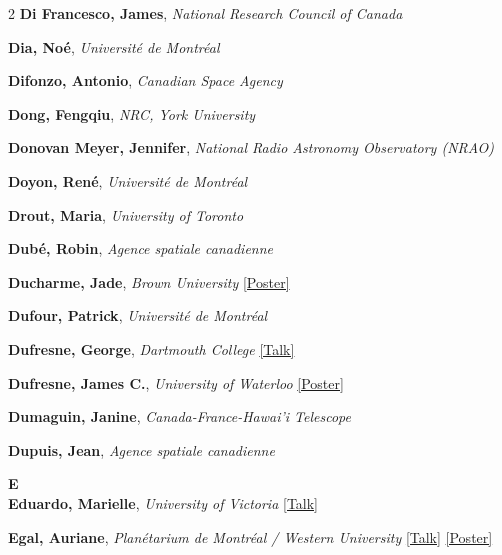 \begin{small}
\begin{multicols}{2}
\textbf{Di Francesco, James}, {\footnotesize\textit{National Research Council of Canada}}\par
\textbf{Dia, Noé}, {\footnotesize\textit{Université de Montréal}}\par
\textbf{Difonzo, Antonio}, {\footnotesize\textit{Canadian Space Agency}}\par
\textbf{Dong, Fengqiu}, {\footnotesize\textit{NRC, York University}}\par
\textbf{Donovan Meyer, Jennifer}, {\footnotesize\textit{National Radio Astronomy Observatory (NRAO)}}\par
\textbf{Doyon, René}, {\footnotesize\textit{Université de Montréal}}\par
\textbf{Drout, Maria}, {\footnotesize\textit{University of Toronto}}\par
\textbf{Dubé, Robin}, {\footnotesize\textit{Agence spatiale canadienne}}\par
\textbf{Ducharme, Jade}, {\footnotesize\textit{Brown University}} \hyperref[poster-abstract-page-talk-87]{\scriptsize\textcolor{cascateal}{[Poster]}}\par
\textbf{Dufour, Patrick}, {\footnotesize\textit{Université de Montréal}}\par
\textbf{Dufresne, George}, {\footnotesize\textit{Dartmouth College}} \hyperref[abstract-page-talk-70]{\scriptsize\textcolor{cascablue}{[Talk]}}\par
\textbf{Dufresne, James C.}, {\footnotesize\textit{University of Waterloo}} \hyperref[poster-abstract-page-talk-71]{\scriptsize\textcolor{cascateal}{[Poster]}}\par
\textbf{Dumaguin, Janine}, {\footnotesize\textit{Canada-France-Hawai'i Telescope}}\par
\textbf{Dupuis, Jean}, {\footnotesize\textit{Agence spatiale canadienne}}\par

{\sffamily\bfseries\color{cascablue}\large E}\\[2pt]

\textbf{Eduardo, Marielle}, {\footnotesize\textit{University of Victoria}} \hyperref[abstract-page-talk-319]{\scriptsize\textcolor{cascablue}{[Talk]}}\par
\textbf{Egal, Auriane}, {\footnotesize\textit{Planétarium de Montréal / Western University}} \hyperref[abstract-page-talk-177]{\scriptsize\textcolor{cascablue}{[Talk]}} \hyperref[poster-abstract-page-talk-182]{\scriptsize\textcolor{cascateal}{[Poster]}}\par


\end{multicols}
\end{small}
